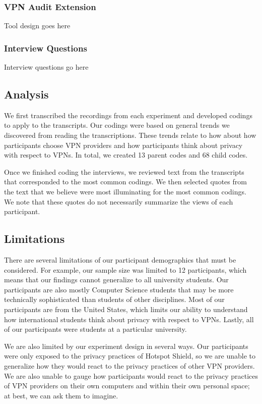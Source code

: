\subsubsection{VPN Audit Extension}
Tool design goes here

\subsubsection{Interview Questions}
Interview questions go here

\subsection{Analysis}
We first transcribed the recordings from each experiment and developed codings to apply to the transcripts.
Our codings were based on general trends we discovered from reading the transcriptions.
These trends relate to how about how participants choose VPN providers and how participants think about privacy with respect to VPNs.
In total, we created 13 parent codes and 68 child codes.

Once we finished coding the interviews, we reviewed text from the transcripts that corresponded to the most common codings.
We then selected quotes from the text that we believe were most illuminating for the most common codings.
We note that these quotes do not necessarily summarize the views of each participant.

\subsection{Limitations}
There are several limitations of our participant demographics that must be considered.
For example, our sample size was limited to 12 participants, which means that our findings cannot generalize to all university students.
Our participants are also mostly Computer Science students that may be more technically sophisticated than students of other disciplines.
Most of our participants are from the United States, which limits our ability to understand how international students think about privacy with respect to VPNs.
Lastly, all of our participants were students at a particular university.

We are also limited by our experiment design in several ways.
Our participants were only exposed to the privacy practices of Hotspot Shield, so we are unable to generalize how they would react to the privacy practices of other VPN providers.
We are also unable to gauge how participants would react to the privacy practices of VPN providers on their own computers and within their own personal space; at best, we can ask them to imagine.